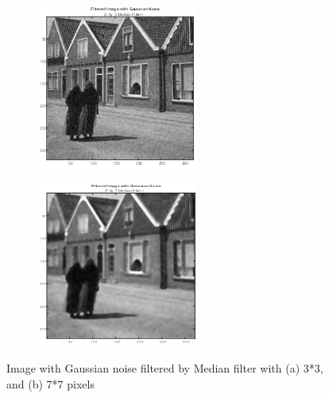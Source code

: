 \begin{figure}
    \centering
    \begin{subfigure}{0.4\textwidth}
        \includegraphics[width=\textwidth]{Resources/F8-a.png}
        \caption{}
        \label{fig:first}
    \end{subfigure}
    \hfill
    \begin{subfigure}{0.4\textwidth}
        \includegraphics[width=\textwidth]{Resources/F8-b.png}
        \caption{}
        \label{fig:Second}
    \end{subfigure}
    \caption{Image with Gaussian noise filtered by Median filter with (a) 3*3, and (b) 7*7 pixels}
    \label{fig:ApplyingFilters}
\end{figure}

